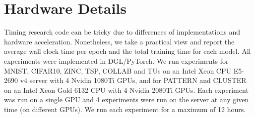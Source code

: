 \documentclass{article}
\begin{document}
\section{Hardware Details}
Timing research code can be tricky due to differences of implementations and hardware acceleration.
Nonetheless, we take a practical view and report the average wall clock time per epoch and the total training time for each model.
All experiments were implemented in DGL/PyTorch. 
We run experiments for MNIST, CIFAR10, ZINC, TSP, COLLAB and TUs on an Intel Xeon CPU E5-2690 v4 server with 4 Nvidia 1080Ti GPUs, and for PATTERN and CLUSTER on an Intel Xeon Gold 6132 CPU with 4 Nvidia 2080Ti GPUs.
Each experiment was run on a single GPU and 4 experiments were run on the server at any given time (on different GPUs).
We run each experiment for a maximum of 12 hours.
\end{document}
